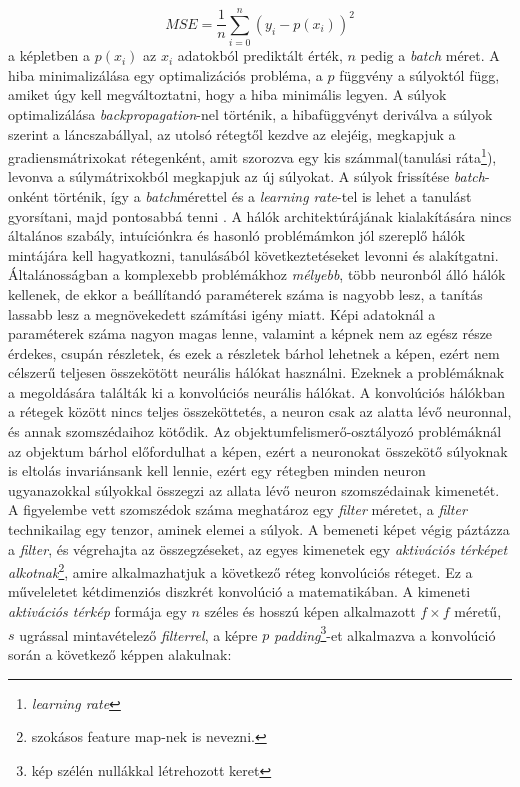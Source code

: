 \documentclass[12pt,letterpaper,oneside,openright]{book}
\begin{document}
\begin{equation}
MSE = \frac{1}{n}\sum^n_{i =0}(y_i -p(x_i))^2
\end{equation}
a képletben a $p(x_i)$ az $x_i$ adatokból prediktált érték, $n$ pedig a \textit{batch} méret. A hiba minimalizálása egy optimalizációs probléma, a $p$ függvény a súlyoktól függ, amiket úgy kell megváltoztatni, hogy a hiba minimális legyen. A súlyok optimalizálása \textit{backpropagation}-nel történik, a hibafüggvényt deriválva a súlyok szerint a láncszabállyal, az utolsó rétegtől kezdve az elejéig, megkapjuk a gradiensmátrixokat rétegenként, amit szorozva egy kis számmal(tanulási ráta\footnote{\textit{learning rate}}), levonva a súlymátrixokból megkapjuk az új súlyokat. A súlyok frissítése \textit{batch}-onként történik, így a \textit{batch}mérettel és a \textit{learning rate}-tel is lehet a tanulást gyorsítani, majd pontosabbá tenni \cite{batchs}.
\newline\indent
A hálók architektúrájának kialakítására nincs általános szabály, intuíciónkra és hasonló problémámkon jól szereplő hálók mintájára kell hagyatkozni, tanulásából következtetéseket levonni és alakítgatni. Általánosságban a komplexebb problémákhoz \textit{mélyebb}, több neuronból álló hálók kellenek, de ekkor a beállítandó paraméterek száma is nagyobb lesz, a tanítás lassabb lesz a megnövekedett számítási igény miatt. Képi adatoknál a paraméterek száma nagyon magas lenne, valamint a képnek nem az egész része érdekes, csupán részletek, és ezek a részletek bárhol lehetnek a képen, ezért nem célszerű teljesen összekötött neurális hálókat használni. Ezeknek a problémáknak a megoldására találták ki a konvolúciós neurális hálókat.
\newline\indent
A konvolúciós hálókban a rétegek között nincs teljes összeköttetés, a neuron csak az alatta lévő neuronnal, és annak szomszédaihoz kötődik. Az objektumfelismerő-osztályozó problémáknál az objektum bárhol előfordulhat a képen, ezért a neuronokat összekötő súlyoknak is eltolás invariánsank kell lennie, ezért egy rétegben minden neuron ugyanazokkal súlyokkal összegzi az allata lévő neuron szomszédainak kimenetét. A figyelembe vett szomszédok száma meghatároz egy \textit{filter} méretet, a \textit{filter} technikailag egy tenzor, aminek elemei a súlyok. A bemeneti képet végig páztázza a \textit{filter}, és végrehajta az összegzéseket, az egyes kimenetek egy \textit{aktivációs térképet alkotnak}\footnote{szokásos feature map-nek is nevezni.}, amire alkalmazhatjuk a következő réteg konvolúciós réteget. Ez a műveleletet kétdimenziós diszkrét konvolúció a matematikában. A kimeneti \textit{aktivációs térkép} formája egy $n$ széles és hosszú képen alkalmazott $f\times f$ méretű, $s$ ugrással mintavételező \textit{filterrel}, a képre $p$ \textit{padding}\footnote{kép szélén nullákkal létrehozott keret}-et alkalmazva a konvolúció során a következő képpen alakulnak:
\end{document}
